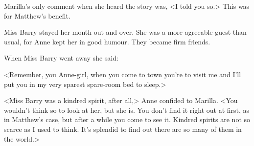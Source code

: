 Marilla's only comment when she heard the story was, <I told you so.> This was for Matthew's benefit.

Miss Barry stayed her month out and over. She was a more agreeable guest than usual, for Anne kept her in good humour. They became firm friends.

When Miss Barry went away she said:

<Remember, you Anne-girl, when you come to town you're to visit me and I'll put you in my very sparest spare-room bed to sleep.>

<Miss Barry was a kindred spirit, after all,> Anne confided to Marilla. <You wouldn't think so to look at her, but she is. You don't find it right out at first, as in Matthew's case, but after a while you come to see it. Kindred spirits are not so scarce as I used to think. It's splendid to find out there are so many of them in the world.>